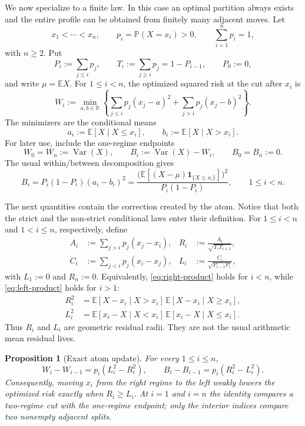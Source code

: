 \documentclass[a4paper]{amsart}
\numberwithin{equation}{section}
\newtheorem{proposition}[theorem]{Proposition}
\theoremstyle{remark}
\newcommand{\E}{\mathbb E}
\newcommand{\Pp}{\mathbb P}
\newcommand{\R}{\mathbb R}
\newcommand{\1}{\mathbf 1}
\newcommand{\Var}{\operatorname{Var}}
\begin{document}
We now specialize to a finite law.  In this case an optimal partition always
exists and the entire profile can be obtained from finitely many adjacent
moves.  Let
\begin{equation}\label{eq:finite-law}
  x_1<\cdots<x_n,\qquad
  p_i=\Pp(X=x_i)>0,\qquad \sum_{i=1}^n p_i=1,
\end{equation}
with $n\geq2$.  Put
\[
  P_i:=\sum_{j\leq i}p_j,\qquad
  T_i:=\sum_{j\geq i}p_j=1-P_{i-1},
  \qquad P_0:=0,
\]
and write $\mu=\E X$.  For $1\leq i<n$, the optimized squared risk at
the cut after $x_i$ is
\begin{equation}\label{eq:scalar-risk}
  W_i:=\min_{a,b\in\R}
  \left\{\sum_{j\leq i}p_j(x_j-a)^2
        +\sum_{j>i}p_j(x_j-b)^2\right\}.
\end{equation}
The minimizers are the conditional means
\[
  a_i:=\E[X\mid X\leq x_i],\qquad
  b_i:=\E[X\mid X>x_i].
\]
For later use, include the one-regime endpoints
\[
  W_0=W_n:=\Var(X),\qquad B_i:=\Var(X)-W_i,
  \qquad B_0=B_n:=0.
\]
The usual within/between decomposition gives
\begin{equation}\label{eq:gain-formula}
 B_i=P_i(1-P_i)(a_i-b_i)^2
 =\frac{\bigl(\E[(X-\mu)\1_{\{X\leq x_i\}}]\bigr)^2}
        {P_i(1-P_i)},\qquad 1\leq i<n.
\end{equation}

The next quantities contain the correction created by the atom.  Notice that
both the strict and the non-strict conditional laws enter their definition.
For $1\leq i<n$ and $1<i\leq n$, respectively, define
\begin{align}
 A_i&:=\sum_{j>i}p_j(x_j-x_i),
 &R_i&:=\frac{A_i}{\sqrt{T_iT_{i+1}}},\label{eq:right-radius}\\
 C_i&:=\sum_{j<i}p_j(x_i-x_j),
 &L_i&:=\frac{C_i}{\sqrt{P_{i-1}P_i}},\label{eq:left-radius}
\end{align}
with $L_1:=0$ and $R_n:=0$.  Equivalently, \eqref{eq:right-product} holds for
$i<n$, while \eqref{eq:left-product} holds for $i>1$:
\begin{align}
 R_i^2
 &=\E[X-x_i\mid X>x_i]\,
   \E[X-x_i\mid X\geq x_i],\label{eq:right-product}\\
 L_i^2
 &=\E[x_i-X\mid X<x_i]\,
   \E[x_i-X\mid X\leq x_i].\label{eq:left-product}
\end{align}
Thus $R_i$ and $L_i$ are geometric residual radii.  They are not the usual
arithmetic mean residual lives.

\begin{proposition}[Exact atom update]\label{prop:atom-update}
For every $1\leq i\leq n$,
\begin{equation}\label{eq:atom-update}
 W_i-W_{i-1}=p_i(L_i^2-R_i^2),\qquad
 B_i-B_{i-1}=p_i(R_i^2-L_i^2).
\end{equation}
Consequently, moving $x_i$ from the right regime to the left weakly lowers
the optimized risk exactly when $R_i\geq L_i$.  At $i=1$ and $i=n$ the
identity compares a two-regime cut with the one-regime endpoint; only the
interior indices compare two nonempty adjacent splits.
\end{proposition}
\end{document}
